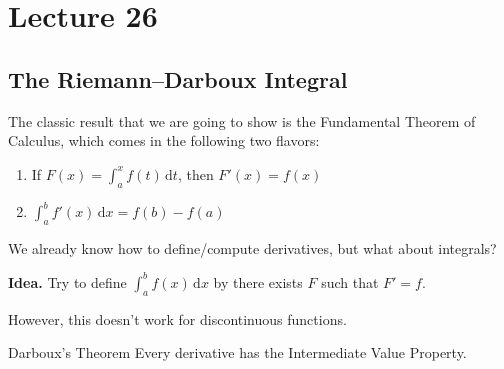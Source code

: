 \documentclass[class=article, crop=false]{standalone}
\begin{document}
  \section{Lecture 26}
  \subsection{The Riemann--Darboux Integral}
  The classic result that we are going to show is the Fundamental Theorem of Calculus, which comes in the following two flavors:
  \begin{enumerate}[label=(\arabic*)]
    \item If $F(x) = \int_{a}^{x}f(t) \,\mathrm dt$, then $F'(x) = f(x)$
    \item $\int_{a}^{b}f'(x) \,\mathrm dx = f(b) - f(a)$
  \end{enumerate}
  We already know how to define/compute derivatives, but what about integrals? \par
  \textbf{Idea.} Try to define $\int_{a}^{b}f(x) \,\mathrm dx$ by there exists $F$ such that $F' = f$. \par
  However, this doesn't work for discontinuous functions. \par
  \begin{theorem}{Darboux's Theorem}
    Every derivative has the Intermediate Value Property.
  \end{theorem}
\end{document}
